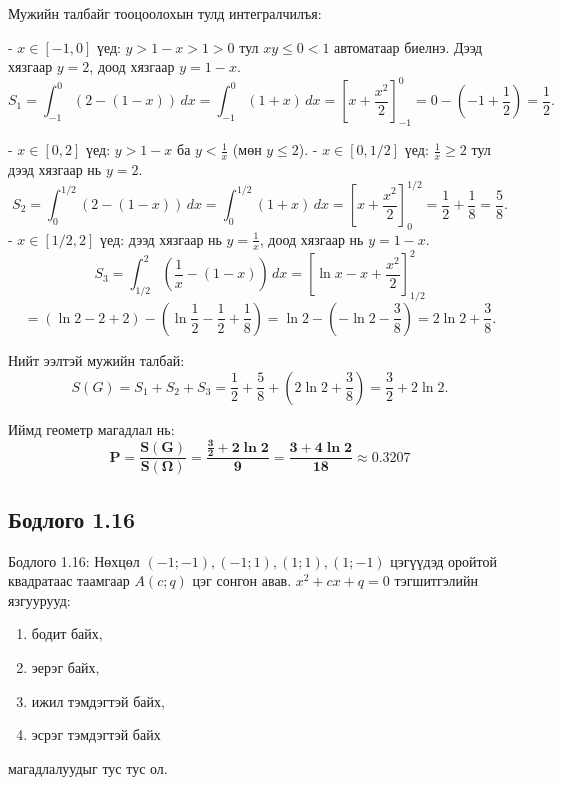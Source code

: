 \documentclass[11pt,a4paper]{article}
\begin{document}
Мужийн талбайг тооцоолохын тулд интегралчилъя:

- $x \in [-1, 0]$ үед: $y > 1 - x > 1 > 0$ тул $xy \le 0 < 1$ автоматаар биелнэ. Дээд хязгаар $y = 2$, доод хязгаар $y = 1 - x$.
  \[
    S_1 = \int_{-1}^0 (2 - (1 - x)) \, dx = \int_{-1}^0 (1 + x) \, dx = \left[ x + \frac{x^2}{2} \right]_{-1}^0 = 0 - \left(-1 + \frac{1}{2}\right) = \frac{1}{2}.
  \]

- $x \in [0, 2]$ үед: $y > 1 - x$ ба $y < \frac{1}{x}$ (мөн $y \le 2$).
  - $x \in [0, 1/2]$ үед: $\frac{1}{x} \ge 2$ тул дээд хязгаар нь $y = 2$.
    \[
      S_2 = \int_0^{1/2} (2 - (1 - x)) \, dx = \int_0^{1/2} (1 + x) \, dx = \left[ x + \frac{x^2}{2} \right]_0^{1/2} = \frac{1}{2} + \frac{1}{8} = \frac{5}{8}.
    \]
  - $x \in [1/2, 2]$ үед: дээд хязгаар нь $y = \frac{1}{x}$, доод хязгаар нь $y = 1 - x$.
    \[
      S_3 = \int_{1/2}^2 \left(\frac{1}{x} - (1 - x)\right) \, dx = \left[ \ln x - x + \frac{x^2}{2} \right]_{1/2}^2
    \]
    \[
      = (\ln 2 - 2 + 2) - \left(\ln\frac{1}{2} - \frac{1}{2} + \frac{1}{8}\right) = \ln 2 - \left(-\ln 2 - \frac{3}{8}\right) = 2\ln 2 + \frac{3}{8}.
    \]

Нийт ээлтэй мужийн талбай:
\[
  S(G) = S_1 + S_2 + S_3 = \frac{1}{2} + \frac{5}{8} + \left(2\ln 2 + \frac{3}{8}\right) = \frac{3}{2} + 2\ln 2.
\]

Иймд геометр магадлал нь:
\[
  \mathbf{P = \frac{S(G)}{S(\Omega)} = \frac{\frac{3}{2} + 2\ln 2}{9} = \frac{3 + 4\ln 2}{18} \approx 0.3207}
\]

\vspace{0.8em}

\subsection*{Бодлого 1.16}

\begin{problembox}{Бодлого 1.16: Нөхцөл}
$(-1; -1), (-1; 1), (1; 1), (1; -1)$ цэгүүдэд оройтой квадратаас таамгаар $A(c; q)$ цэг сонгон авав. $x^2 + cx + q = 0$ тэгшитгэлийн язгуурууд:
\begin{enumerate}[label=\textbf{\alph*)}, leftmargin=1.8em, itemsep=1pt]
  \item бодит байх,
  \item эерэг байх,
  \item ижил тэмдэгтэй байх,
  \item эсрэг тэмдэгтэй байх
\end{enumerate}
магадлалуудыг тус тус ол.
\end{problembox}
\end{document}
